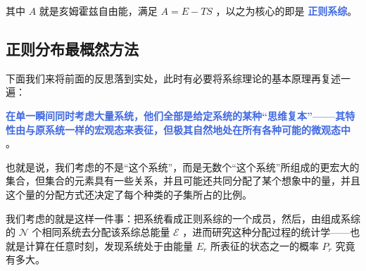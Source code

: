 \documentclass[hyperref,UTF-8]{ctexart}
\newcommand{\0}{\boldsymbol{0}}
\begin{document}
其中 $A$ 就是亥姆霍兹自由能，满足 $A = E - TS$ ，以之为核心的即是 \textcolor{RoyalBlue}{\textbf{\kaishu 正则系综}}。

\subsection{正则分布最概然方法}

下面我们来将前面的反思落到实处，此时有必要将系综理论的基本原理再复述一遍：

\textcolor{RoyalBlue}{\textbf{\kaishu 在单一瞬间同时考虑大量系统，他们全部是给定系统的某种“思维复本”——其特性由与原系统一样的宏观态来表征，但极其自然地处在所有各种可能的微观态中}} \cite{Pathria}。

也就是说，我们考虑的不是“这个系统”，而是无数个“这个系统”所组成的更宏大的集合，但集合的元素具有一些关系，并且可能还共同分配了某个想象中的量，并且这个量的分配方式还决定了每个种类的子集所占的比例。

我们考虑的就是这样一件事：把系统看成正则系综的一个成员，然后，由组成系综的 $\mathcal{N}$ 个相同系统去分配该系综总能量 $\mathcal{E}$ ，进而研究这种分配过程的统计学——也就是计算在任意时刻，发现系统处于由能量 $E_r$ 所表征的状态之一的概率 $P_r$ 究竟有多大。
\end{document}
